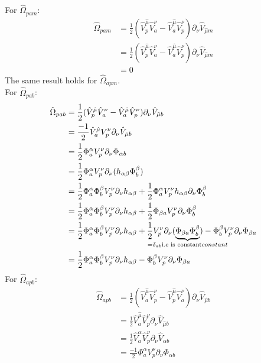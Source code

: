 \documentclass{article}
\begin{document}
For $\hat \Omega_{pam}$:
\begin{align*}
    \hat \Omega_{pam} &= \frac{1}{2}(\hat V^{\hat \mu}_{  p} \hat V^{ \nu}_{a}-\hat V^{\hat \mu}_{a} \hat V^{ \nu}_{p})\partial_{ \nu} \hat V_{\hat \mu m}\\
    &=\frac{1}{2}(\hat V^{\hat \mu}_{  p} \hat V^{ \nu}_{a}-\hat V^{\hat \mu}_{a} \hat V^{ \nu}_{p})\partial_{ \nu} \hat V_{\hat \mu m}\\
    &= 0
\end{align*}
The same result holds for $\hat \Omega_{apm}$.\\
For $\hat \Omega_{pab}$:
\begin{align*}
    \hat \Omega_{pab} &= \frac{1}{2}(\hat V^{\hat \mu}_{  p} \hat V^{ \nu}_{a}-\hat V^{\hat \mu}_{a} \hat V^{ \nu}_{p})\partial_{ \nu} \hat V_{\hat \mu b}\\
    &= \frac{-1}{2}\hat V^{\hat \mu}_{a}  V^{ \nu}_{p}\partial_{ \nu} \hat V_{\hat \mu b}\\
    &= \frac{1}{2} \Phi^{ \alpha}_{a}  V^{ \nu}_{p}\partial_{ \nu}  \Phi_{\alpha b}\\
    &= \frac{1}{2} \Phi^{ \alpha}_{a}  V^{ \nu}_{p}\partial_{ \nu}( h_{\alpha \beta} \Phi^{\beta}_{ b})\\
    &= \frac{1}{2} \Phi^{ \alpha}_{a}  \Phi^{\beta}_{ b}V^{ \nu}_{p}\partial_{ \nu} h_{\alpha \beta}  +\frac{1}{2} \Phi^{ \alpha}_{a}  V^{ \nu}_{p}h_{\alpha \beta}\partial_{ \nu}  \Phi^{\beta}_{ b}\\
    &= \frac{1}{2} \Phi^{ \alpha}_{a}  \Phi^{\beta}_{ b}V^{ \nu}_{p}\partial_{ \nu} h_{\alpha \beta}  +\frac{1}{2} \Phi_{\beta a}  V^{ \nu}_{p}\partial_{ \nu}  \Phi^{\beta}_{ b}\\
    &= \frac{1}{2} \Phi^{ \alpha}_{a}  \Phi^{\beta}_{ b}V^{ \nu}_{p}\partial_{ \nu} h_{\alpha \beta}  +\frac{1}{2}   V^{ \nu}_{p}\partial_{ \nu} (\underbrace{\Phi_{\beta a} \Phi^{\beta}_{ b}}_{\mathclap{ =\delta_{ab} \text{i.e is constant} constant}}) - \Phi^{\beta}_{ b} V^{ \nu}_{p}\partial_{ \nu} \Phi_{\beta a} \\
    &=\frac{1}{2} \Phi^{ \alpha}_{a}  \Phi^{\beta}_{ b}V^{ \nu}_{p}\partial_{ \nu} h_{\alpha \beta} - \Phi^{\beta}_{ b} V^{ \nu}_{p}\partial_{ \nu} \Phi_{\beta a} 
\end{align*}
For $\hat \Omega_{apb}$:
\begin{align*}
    \hat \Omega_{apb} &= \frac{1}{2}(\hat V^{\hat \mu}_{  a} \hat V^{ \nu}_{p}-\hat V^{\hat \mu}_{p} \hat V^{ \nu}_{a})\partial_{ \nu} \hat V_{\hat \mu b}\\
    &= \frac{1}{2}\hat V^{\hat \mu}_{  a} \hat V^{ \nu}_{p}\partial_{ \nu} \hat V_{\hat \mu b}\\
    &= \frac{1}{2}\hat V^{\alpha}_{  a} \hat V^{ \nu}_{p}\partial_{ \nu} \hat V_{\alpha b}\\
    &= \frac{-1}{2} \Phi^{\alpha}_{  a}  V^{ \nu}_{p}\partial_{ \nu} \Phi_{\alpha b}\\
\end{align*}
\end{document}
